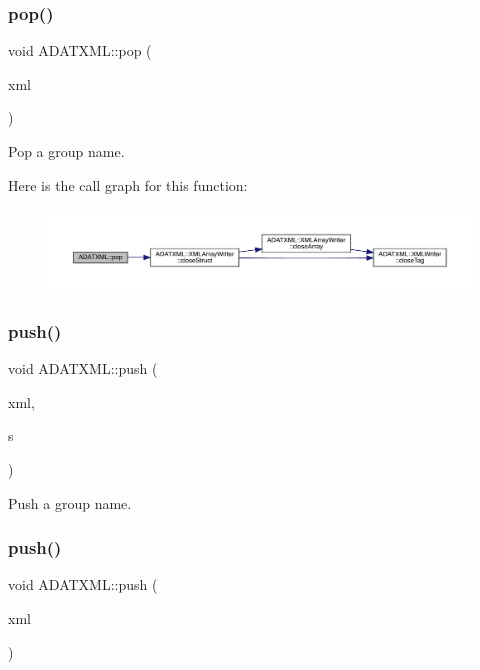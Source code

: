 \subsubsection{\texorpdfstring{pop()}{pop()}\hspace{0.1cm}{\footnotesize\ttfamily [2/2]}}
{\footnotesize\ttfamily void A\+D\+A\+T\+X\+M\+L\+::pop (\begin{DoxyParamCaption}\item[{\mbox{\hyperlink{classADATXML_1_1XMLArrayWriter}{X\+M\+L\+Array\+Writer}} \&}]{xml }\end{DoxyParamCaption})}



Pop a group name. 

Here is the call graph for this function\+:\nopagebreak
\begin{figure}[H]
\begin{center}
\leavevmode
\includegraphics[width=350pt]{d2/da3/group__io_gafc9d3fe6a9094c09371a9213eb4b6cdd_cgraph}
\end{center}
\end{figure}
\mbox{\label{group__io_ga019b535f09d2107aa9012cd3fce58193}} 
\subsubsection{\texorpdfstring{push()}{push()}\hspace{0.1cm}{\footnotesize\ttfamily [1/2]}}
{\footnotesize\ttfamily void A\+D\+A\+T\+X\+M\+L\+::push (\begin{DoxyParamCaption}\item[{\mbox{\hyperlink{classADATXML_1_1XMLWriter}{X\+M\+L\+Writer}} \&}]{xml,  }\item[{const std\+::string \&}]{s }\end{DoxyParamCaption})}



Push a group name. 

\mbox{\label{group__io_ga957f4130fa008139cd16879b0794ae54}} 
\subsubsection{\texorpdfstring{push()}{push()}\hspace{0.1cm}{\footnotesize\ttfamily [2/2]}}
{\footnotesize\ttfamily void A\+D\+A\+T\+X\+M\+L\+::push (\begin{DoxyParamCaption}\item[{\mbox{\hyperlink{classADATXML_1_1XMLArrayWriter}{X\+M\+L\+Array\+Writer}} \&}]{xml }\end{DoxyParamCaption})}



